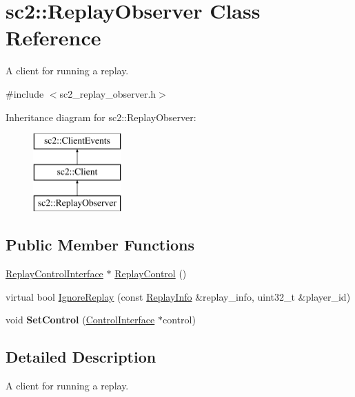 \hypertarget{classsc2_1_1_replay_observer}{}\section{sc2\+:\+:Replay\+Observer Class Reference}
\label{classsc2_1_1_replay_observer}


A client for running a replay.  




{\ttfamily \#include $<$sc2\+\_\+replay\+\_\+observer.\+h$>$}

Inheritance diagram for sc2\+:\+:Replay\+Observer\+:\begin{figure}[H]
\begin{center}
\leavevmode
\includegraphics[height=3.000000cm]{classsc2_1_1_replay_observer}
\end{center}
\end{figure}
\subsection*{Public Member Functions}
\begin{DoxyCompactItemize}
\item 
\hyperlink{classsc2_1_1_replay_control_interface}{Replay\+Control\+Interface} $\ast$ \hyperlink{classsc2_1_1_replay_observer_a99198b2295dc998662b929f96ad17d65}{Replay\+Control} ()
\item 
virtual bool \hyperlink{classsc2_1_1_replay_observer_a35461e606619ea1f2c968e37ab164d5d}{Ignore\+Replay} (const \hyperlink{structsc2_1_1_replay_info}{Replay\+Info} \&replay\+\_\+info, uint32\+\_\+t \&player\+\_\+id)
\item 
\mbox{\label{classsc2_1_1_replay_observer_ac0f3061d817e87afd8fd43753ffc3612}} 
void {\bfseries Set\+Control} (\hyperlink{classsc2_1_1_control_interface}{Control\+Interface} $\ast$control)
\end{DoxyCompactItemize}


\subsection{Detailed Description}
A client for running a replay. 

